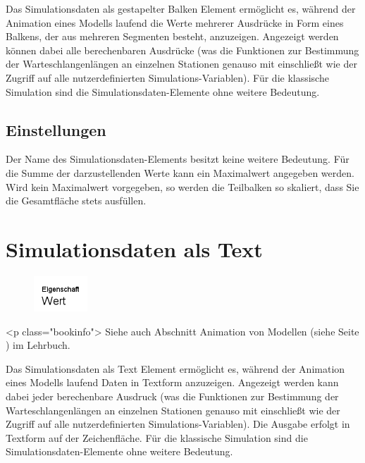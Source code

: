 Das Simulationsdaten als gestapelter Balken Element ermöglicht es, während der Animation eines Modells laufend die Werte
mehrerer Ausdrücke in Form eines Balkens, der aus mehreren Segmenten besteht, anzuzeigen. Angezeigt werden können dabei
alle berechenbaren Ausdrücke (was die Funktionen zur Bestimmung der Warteschlangenlängen an einzelnen Stationen genauso
mit einschließt wie der Zugriff auf alle nutzerdefinierten Simulations-Variablen). Für die klassische Simulation sind die
Simulationsdaten-Elemente ohne weitere Bedeutung.

\subsection*{Einstellungen}

Der Name des Simulationsdaten-Elements besitzt keine weitere Bedeutung.
Für die Summe der darzustellenden Werte kann ein Maximalwert angegeben werden.
Wird kein Maximalwert vorgegeben, so werden die Teilbalken so skaliert,
dass Sie die Gesamtfläche stets ausfüllen.


\section{Simulationsdaten als Text}
\label{ref:ModelElementAnimationText}

\begin{figure}
\vspace{-22pt}
\includegraphics[width=2cm]{imageModelElementAnimationText.png}
\vspace{-22pt}
\end{figure}

<p class="bookinfo">
Siehe auch Abschnitt Animation von Modellen (siehe Seite \pageref{ref:book:5.4.3}) im Lehrbuch.

Das Simulationsdaten als Text Element ermöglicht es, während der Animation eines Modells laufend Daten in Textform anzuzeigen.
Angezeigt werden kann dabei jeder berechenbare Ausdruck (was die Funktionen zur Bestimmung der Warteschlangenlängen
an einzelnen Stationen genauso mit einschließt wie der Zugriff auf alle nutzerdefinierten Simulations-Variablen).
Die Ausgabe erfolgt in Textform auf der Zeichenfläche. Für die klassische Simulation sind die Simulationsdaten-Elemente
ohne weitere Bedeutung.

